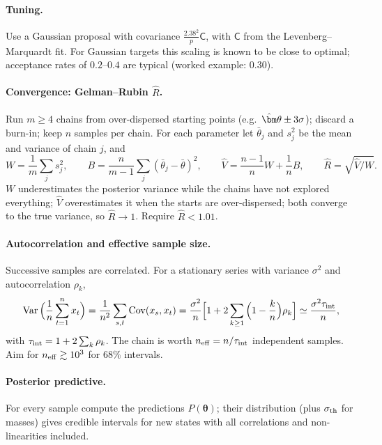 \documentclass[11pt,a4paper]{article}
\numberwithin{equation}{section}
\theoremstyle{definition}
\theoremstyle{plain}
\theoremstyle{remark}
\numberwithin{algorithm}{section}
\newcommand{\sC}{\mathsf C}
\newcommand{\vth}{\bm\theta}
\begin{document}
\paragraph{Tuning.} Use a Gaussian proposal with covariance $\frac{2.38^2}{p}\sC$, with $\sC$ from the Levenberg--Marquardt fit. For Gaussian targets this scaling is known to be close to optimal; acceptance rates of $0.2$--$0.4$ are typical (worked example: $0.30$).

\paragraph{Convergence: Gelman--Rubin $\hat R$.} Run $m\ge4$ chains from over-dispersed starting points (e.g.\ $\hat\vth\pm3\sigma$); discard a burn-in; keep $n$ samples per chain. For each parameter let $\bar\theta_j$ and $s_j^2$ be the mean and variance of chain $j$, and
\begin{equation}
W=\frac1m\sum_js_j^2,\qquad B=\frac{n}{m-1}\sum_j(\bar\theta_j-\bar\theta)^2,\qquad \hat V=\frac{n-1}{n}W+\frac1nB,\qquad \hat R=\sqrt{\hat V/W}.
\end{equation}
$W$ underestimates the posterior variance while the chains have not explored everything; $\hat V$ overestimates it when the starts are over-dispersed; both converge to the true variance, so $\hat R\to1$. Require $\hat R<1.01$.

\paragraph{Autocorrelation and effective sample size.} Successive samples are correlated. For a stationary series with variance $\sigma^2$ and autocorrelation $\rho_k$,
\[
\operatorname{Var}\Big(\frac1n\sum_{t=1}^nx_t\Big)=\frac1{n^2}\sum_{s,t}\operatorname{Cov}(x_s,x_t)=\frac{\sigma^2}{n}\Big[1+2\sum_{k\ge1}\Big(1-\frac kn\Big)\rho_k\Big]\simeq\frac{\sigma^2\tau_{\rm int}}{n},
\]
with $\tau_{\rm int}=1+2\sum_k\rho_k$. The chain is worth $n_{\rm eff}=n/\tau_{\rm int}$ independent samples. Aim for $n_{\rm eff}\gtrsim10^3$ for $68\%$ intervals.

\paragraph{Posterior predictive.} For every sample compute the predictions $P(\vth)$; their distribution (plus $\sigma_{\rm th}$ for masses) gives credible intervals for new states with all correlations and non-linearities included.
\end{document}
